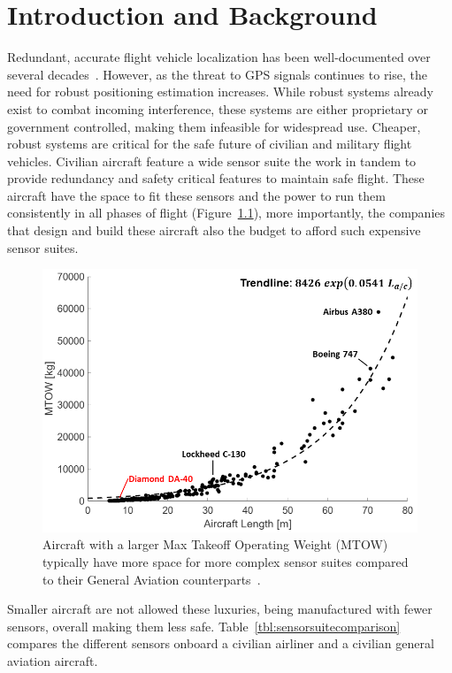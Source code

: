\chapter{Introduction and Background}
Redundant, accurate flight vehicle localization has been well-documented over several decades~\cite{zhaoCooperativeLocalizationBased2017,rufaSensorFusionUnmanned2014,tennyRobustNavigationUrban2022,kandemirProbabilisticMeasurementMethod2018}. However, as the threat to GPS signals continues to rise, the need for robust positioning estimation increases. While robust systems already exist to combat incoming interference, these systems are either proprietary or government controlled, making them infeasible for widespread use. Cheaper, robust systems are critical for the safe future of civilian and military flight vehicles. Civilian aircraft feature a wide sensor suite the work in tandem to provide redundancy and safety critical features to maintain safe flight. These aircraft have the space to fit these sensors and the power to run them consistently in all phases of flight (Figure~\ref{fig:weights}), more importantly, the companies that design and build these aircraft also the budget to afford such expensive sensor suites.

\begin{figure}[!ht]\label{fig:weights}
    \centering
    \includegraphics[width=.6\linewidth]{Figures/weights.png}
    \caption{Aircraft with a larger Max Takeoff Operating Weight (MTOW) typically have more space for more complex sensor suites compared to their General Aviation counterparts~\cite{AircraftCharacteristicsDatabase}.}
\end{figure}

Smaller aircraft are not allowed these luxuries, being manufactured with fewer sensors, overall making them less safe. Table~\ref{tbl:sensorsuitecomparison} compares the different sensors onboard a civilian airliner and a civilian general aviation aircraft.

